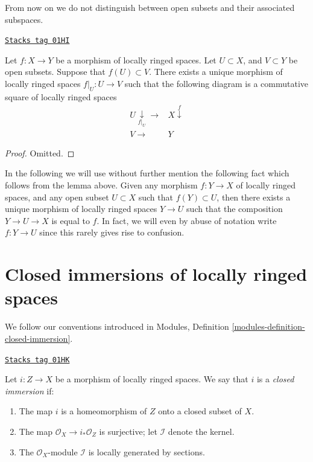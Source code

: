 From now on we do not distinguish between open subsets
and their associated subspaces.

\begin{lemma}
\label{schemes-lemma-restrict-map-to-opens}
\href{https://stacks.math.columbia.edu/tag/01HI}{\texttt{Stacks tag 01HI}}

Let $f : X \to Y$ be a morphism of locally ringed spaces.
Let $U \subset X$, and $V \subset Y$ be open subsets.
Suppose that $f(U) \subset V$. There exists a unique
morphism of locally ringed spaces $f|_U : U \to V$ such
that the following diagram is a commutative square of
locally ringed spaces
$$
\begin{array}{cc}U \underset{f|_U}{\downarrow}\longrightarrow & X \overset{f}{\downarrow} \\ V \longrightarrow & Y\end{array}
$$
\end{lemma}

\begin{proof}
Omitted.
\end{proof}

In the following we will use without further mention the following
fact which follows from the lemma above. Given any morphism
$f : Y \to X$ of locally ringed spaces, and any open subset
$U \subset X$ such that $f(Y) \subset U$, then there exists
a unique morphism of locally ringed spaces $Y \to U$ such that
the composition $Y \to U \to X$ is equal to $f$. In fact, we will
even by abuse of notation write $f : Y \to U$ since this rarely
gives rise to confusion.

\section{Closed immersions of locally ringed spaces}
\label{schemes-section-closed-immersion}
We follow our conventions introduced in
Modules, Definition \ref{modules-definition-closed-immersion}.

\begin{definition}
\label{schemes-definition-closed-immersion-locally-ringed-spaces}
\href{https://stacks.math.columbia.edu/tag/01HK}{\texttt{Stacks tag 01HK}}

Let $i : Z \to X$ be a morphism of locally ringed spaces.
We say that $i$ is a {\it closed immersion} if:
\begin{enumerate}
\item The map $i$ is a homeomorphism of $Z$ onto a closed subset of $X$.
\item The map $\mathcal{O}_X \to i_*\mathcal{O}_Z$ is surjective;
let $\mathcal{I}$ denote the kernel.
\item The $\mathcal{O}_X$-module $\mathcal{I}$
is locally generated by sections.
\end{enumerate}
\end{definition}


